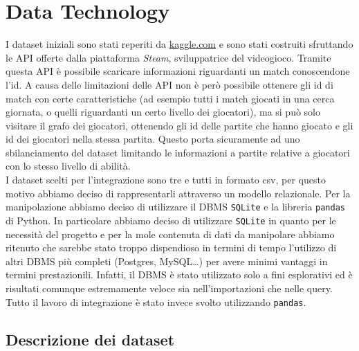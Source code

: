 \documentclass[a4paper,12pt,openany,oneside]{book}
\begin{document}
\chapter{Data Technology}
I dataset iniziali sono stati reperiti da \url{kaggle.com} e sono stati costruiti sfruttando le API offerte dalla piattaforma \textit{Steam}, sviluppatrice del videogioco. Tramite questa API è possibile scaricare informazioni riguardanti un match conoscendone l'id. A causa delle limitazioni delle API non è però possibile ottenere gli id di match con certe caratteristiche (ad esempio tutti i match giocati in una cerca giornata, o quelli riguardanti un certo livello dei giocatori), ma si può solo visitare il grafo dei giocatori, ottenendo gli id delle partite che hanno giocato e gli id dei giocatori nella stessa partita. Questo porta sicuramente ad uno sbilanciamento del dataset limitando le informazioni a partite relative a giocatori con lo stesso livello di abilità.
\\[0.8em]
I dataset scelti per l'integrazione sono tre e tutti in formato csv, per questo motivo abbiamo deciso di rappresentarli attraverso un modello relazionale. Per la manipolazione abbiamo deciso di utilizzare il DBMS \verb|SQLite| e la libreria \verb|pandas| di Python. In particolare abbiamo deciso di utilizzare \verb|SQLite| in quanto per le necessità del progetto e per la mole contenuta di dati da manipolare abbiamo ritenuto che sarebbe stato troppo dispendioso in termini di tempo l'utilizzo di altri DBMS più completi (Postgres, MySQL\dots) per avere minimi vantaggi in termini prestazionili. Infatti, il DBMS è stato utilizzato solo a fini esplorativi ed è risultati comunque estremamente veloce sia nell'importazioni che nelle query. Tutto il lavoro di integrazione è stato invece svolto utilizzando \verb|pandas|.
\section{Descrizione dei dataset}
\end{document}
